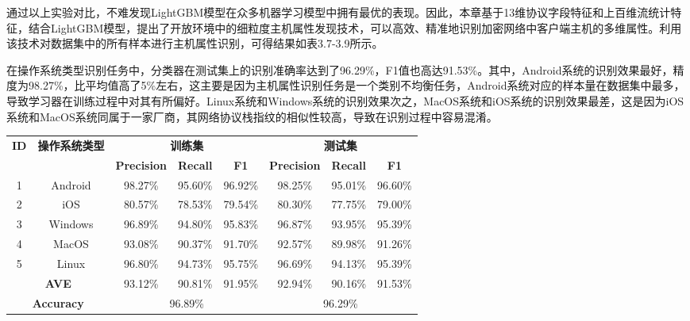 通过以上实验对比，不难发现LightGBM模型在众多机器学习模型中拥有最优的表现。因此，本章基于13维协议字段特征和上百维流统计特征，结合LightGBM模型，提出了开放环境中的细粒度主机属性发现技术，可以高效、精准地识别加密网络中客户端主机的多维属性。利用该技术对数据集中的所有样本进行主机属性识别，可得结果如表3.7-3.9所示。

在操作系统类型识别任务中，分类器在测试集上的识别准确率达到了96.29\%，F1值也高达91.53\%。其中，Android系统的识别效果最好，精度为98.27\%，比平均值高了5\%左右，这主要是因为主机属性识别任务是一个类别不均衡任务，Android系统对应的样本量在数据集中最多，导致学习器在训练过程中对其有所偏好。Linux系统和Windows系统的识别效果次之，MacOS系统和iOS系统的识别效果最差，这是因为iOS系统和MacOS系统同属于一家厂商，其网络协议栈指纹的相似性较高，导致在识别过程中容易混淆。

\begin{table}[!h]
    \centering
    \footnotesize
    \setlength{\tabcolsep}{8pt}
    \renewcommand{\arraystretch}{1}
\begin{tabular}{|c|c|c|c|c|c|c|c|}
\hline
\multirow{2}{*}{\textbf{ID}} & \multirow{2}{*}{\textbf{操作系统类型}} & \multicolumn{3}{c|}{\textbf{训练集}} & \multicolumn{3}{c|}{\textbf{测试集}} \\ \cline{3-8} 
 &  & \textbf{Precision} & \textbf{Recall} & \textbf{F1} & \textbf{Precision} & \textbf{Recall} & \textbf{F1}\\ \hline
1 & Android & 98.27\% & 95.60\% & 96.92\% & 98.25\% & 95.01\% & 96.60\% \\ \hline
2 & iOS & 80.57\% & 78.53\% & 79.54\% & 80.30\% & 77.75\% & 79.00\% \\ \hline
3 & Windows & 96.89\% & 94.80\% & 95.83\% & 96.87\% & 93.95\% & 95.39\% \\ \hline
4 & MacOS & 93.08\% & 90.37\% & 91.70\% & 92.57\% & 89.98\% & 91.26\% \\ \hline
5 & Linux & 96.80\% & 94.73\% & 95.75\% & 96.69\% & 94.13\% & 95.39\% \\ \hline
\multicolumn{2}{|c|}{\textbf{AVE}} & 93.12\% & 90.81\% & 91.95\% & 92.94\% & 90.16\% & 91.53\% \\ \hline
\multicolumn{2}{|c|}{\textbf{Accuracy}} & \multicolumn{3}{c|}{96.89\%} & \multicolumn{3}{c|}{96.29\%} \\ \hline
\end{tabular}
\end{table}

